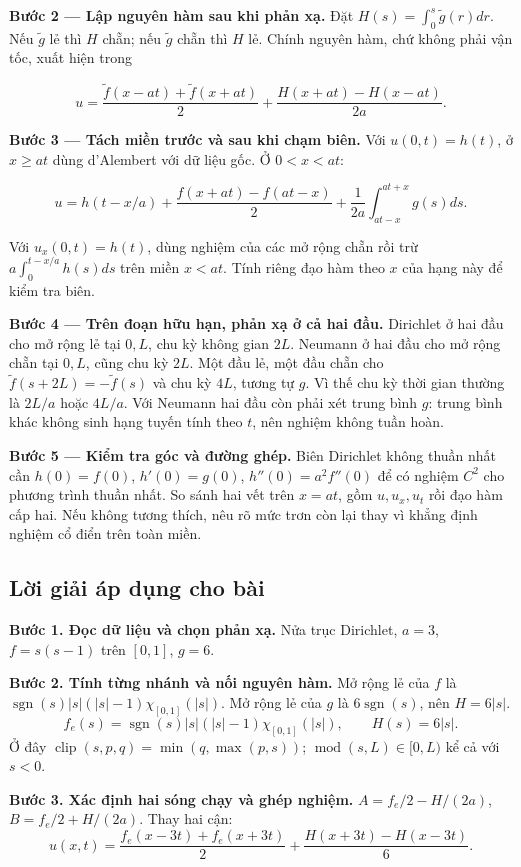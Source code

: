 \documentclass[10pt,a4paper]{article}
\begin{document}
\textbf{Bước 2 — Lập nguyên hàm sau khi phản xạ.} Đặt $H(s)=\int_0^s\widetilde g(r)dr$. Nếu $\widetilde g$ lẻ thì $H$ chẵn; nếu $\widetilde g$ chẵn thì $H$ lẻ. Chính nguyên hàm, chứ không phải vận tốc, xuất hiện trong


\[
u=\frac{\widetilde f(x-at)+\widetilde f(x+at)}2+\frac{H(x+at)-H(x-at)}{2a}.
\]


\textbf{Bước 3 — Tách miền trước và sau khi chạm biên.} Với $u(0,t)=h(t)$, ở $x\ge at$ dùng d'Alembert với dữ liệu gốc. Ở $0<x<at$:


\[
u=h(t-x/a)+\frac{f(x+at)-f(at-x)}2+\frac1{2a}\int_{at-x}^{at+x}g(s)ds.
\]


Với $u_x(0,t)=h(t)$, dùng nghiệm của các mở rộng chẵn rồi trừ $a\int_0^{t-x/a}h(s)ds$ trên miền $x<at$. Tính riêng đạo hàm theo $x$ của hạng này để kiểm tra biên.

\textbf{Bước 4 — Trên đoạn hữu hạn, phản xạ ở cả hai đầu.} Dirichlet ở hai đầu cho mở rộng lẻ tại $0,L$, chu kỳ không gian $2L$. Neumann ở hai đầu cho mở rộng chẵn tại $0,L$, cũng chu kỳ $2L$. Một đầu lẻ, một đầu chẵn cho $\widetilde f(s+2L)=-\widetilde f(s)$ và chu kỳ $4L$, tương tự $g$. Vì thế chu kỳ thời gian thường là $2L/a$ hoặc $4L/a$. Với Neumann hai đầu còn phải xét trung bình $g$: trung bình khác không sinh hạng tuyến tính theo $t$, nên nghiệm không tuần hoàn.

\textbf{Bước 5 — Kiểm tra góc và đường ghép.} Biên Dirichlet không thuần nhất cần $h(0)=f(0)$, $h'(0)=g(0)$, $h''(0)=a^2f''(0)$ để có nghiệm $C^2$ cho phương trình thuần nhất. So sánh hai vết trên $x=at$, gồm $u,u_x,u_t$ rồi đạo hàm cấp hai. Nếu không tương thích, nêu rõ mức trơn còn lại thay vì khẳng định nghiệm cổ điển trên toàn miền.
\subsection*{Lời giải áp dụng cho bài}
\textbf{Bước 1. Đọc dữ liệu và chọn phản xạ.} Nửa trục Dirichlet, $a=3$, $f=s(s-1)$ trên $[0,1]$, $g=6$.

\textbf{Bước 2. Tính từng nhánh và nối nguyên hàm.} Mở rộng lẻ của $f$ là $\operatorname{sgn}(s)|s|(|s|-1)\chi_{[0,1]}(|s|)$. Mở rộng lẻ của $g$ là $6\operatorname{sgn}(s)$, nên $H=6|s|$.
\[f_e(s)=\operatorname{sgn}(s)|s|(|s|-1)\chi_{[0,1]}(|s|),\qquad H(s)=6|s|.\]
Ở đây $\operatorname{clip}(s,p,q)=\min(q,\max(p,s))$; $\operatorname{mod}(s,L)\in[0,L)$ kể cả với $s<0$.

\textbf{Bước 3. Xác định hai sóng chạy và ghép nghiệm.} $A=f_e/2-H/(2a)$, $B=f_e/2+H/(2a)$. Thay hai cận:
\[u(x,t)=\frac{f_e(x-3t)+f_e(x+3t)}2+\frac{H(x+3t)-H(x-3t)}{6}.\]
\end{document}

